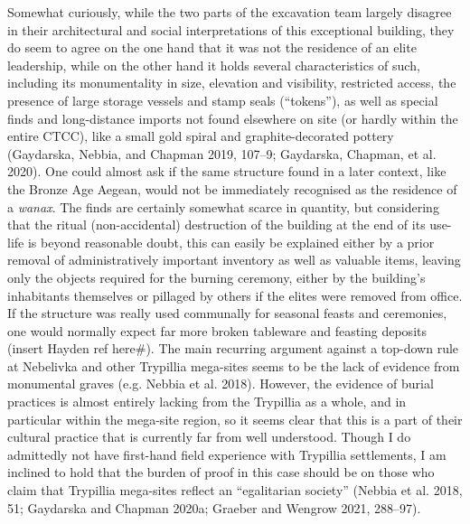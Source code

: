 \documentclass[
  12pt,
  a4paper, twoside]{book}
\begin{document}
Somewhat curiously, while the two parts of the excavation team largely disagree in their architectural and social interpretations of this exceptional building, they do seem to agree on the one hand that it was not the residence of an elite leadership, while on the other hand it holds several characteristics of such, including its monumentality in size, elevation and visibility, restricted access, the presence of large storage vessels and stamp seals (``tokens''), as well as special finds and long-distance imports not found elsewhere on site (or hardly within the entire CTCC), like a small gold spiral and graphite-decorated pottery (Gaydarska, Nebbia, and Chapman 2019, 107--9; Gaydarska, Chapman, et al. 2020). One could almost ask if the same structure found in a later context, like the Bronze Age Aegean, would not be immediately recognised as the residence of a \emph{wanax}. The finds are certainly somewhat scarce in quantity, but considering that the ritual (non-accidental) destruction of the building at the end of its use-life is beyond reasonable doubt, this can easily be explained either by a prior removal of administratively important inventory as well as valuable items, leaving only the objects required for the burning ceremony, either by the building's inhabitants themselves or pillaged by others if the elites were removed from office. If the structure was really used communally for seasonal feasts and ceremonies, one would normally expect far more broken tableware and feasting deposits (insert Hayden ref here\#). The main recurring argument against a top-down rule at Nebelivka and other Trypillia mega-sites seems to be the lack of evidence from monumental graves (e.g. Nebbia et al. 2018). However, the evidence of burial practices is almost entirely lacking from the Trypillia as a whole, and in particular within the mega-site region, so it seems clear that this is a part of their cultural practice that is currently far from well understood. Though I do admittedly not have first-hand field experience with Trypillia settlements, I am inclined to hold that the burden of proof in this case should be on those who claim that Trypillia mega-sites reflect an ``egalitarian society'' (Nebbia et al. 2018, 51; Gaydarska and Chapman 2020a; Graeber and Wengrow 2021, 288--97).
\end{document}
